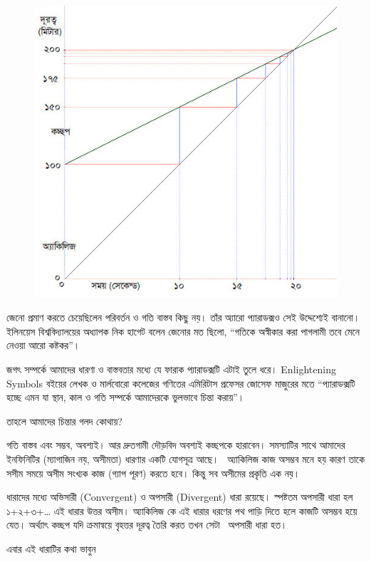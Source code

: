 \documentclass[
]{book}
\begin{document}
\begin{figure}

{\centering \includegraphics[width=0.8\linewidth]{img/achilles2} 

}

\end{figure}

জেনো প্রমাণ করতে চেয়েছিলেন পরিবর্তন ও গতি বাস্তব কিছু নয়। তাঁর অ্যারো প্যারাডক্সও সেই উদ্দেশ্যেই বানানো। ইলিনয়েস বিশ্ববিদ্যালয়ের অধ্যাপক নিক হাগেট বলেন জেনোর মত ছিলো, ``গতিকে অস্বীকার করা পাগলামী তবে মেনে নেওয়া আরো কষ্টকর''।

জগৎ সম্পর্কে আমাদের ধারণা ও বাস্তবতার মধ্যে যে ফারাক প্যারাডক্সটি এটাই তুলে ধরে। Enlightening Symbols বইয়ের লেখক ও মার্লবোরো কলেজের গণিতের এমিরিটাস প্রফেসর জোসেফ মাজুরের মতে ``প্যারাডক্সটি হচ্ছে এমন যা স্থান, কাল ও গতি সম্পর্কে আমাদেরকে ভুলভাবে চিন্তা করায়''।~

তাহলে আমাদের চিন্তার গলদ কোথায়?

গতি বাস্তব এবং সম্ভব, অবশ্যই। আর দ্রুতগামী দৌড়বিদ অবশ্যই কচ্ছপকে হারাবেন। সমস্যাটির সাথে আমাদের ইনফিনিটির (ম্যাগাজিন নয়, অসীমতা) ধারণার একটি যোগসূত্র আছে।~
অ্যাকিলিজ কাজ অসম্ভব মনে হয় কারণ তাকে সসীম সময়ে অসীম সংখ্যক কাজ (গ্যাপ পূরণ) করতে হবে। কিন্তু সব অসীমের প্রকৃতি এক নয়।~

ধারাদের মধ্যে অভিসারী (Convergent) ও অপসারী (Divergent) ধারা রয়েছে। স্পষ্টতম অপসারী ধারা হল ১+২+৩+\ldots{} এই ধারার উত্তর অসীম। অ্যাকিলিজ কে এই ধারার ধরণের পথ পাড়ি দিতে হলে কাজটি অসম্ভব হয়ে যেত। অর্থ্যাৎ কচ্ছপ যদি ক্রমান্বয়ে বৃহত্তর দূরত্ব তৈরি করত তখন সেটা~ অপসারী ধারা হত।~

এবার এই ধারাটির কথা ভাবুন
\end{document}
